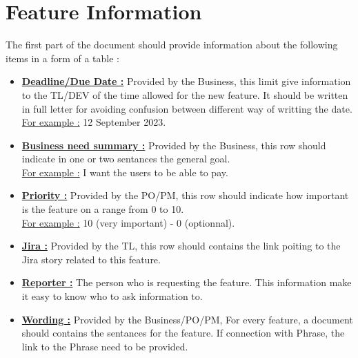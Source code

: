 \documentclass[a4paper,article,oneside]{memoir}
\begin{document}
        \section{Feature Information}
        The first part of the document should provide information about the following items in a form of a table :
        \begin{itemize}
  			\item {\color{BrickRed}\textbf{\underline{Deadline/Due Date :}}} Provided by the \gls{Business}, this limit give information to the \gls{TL}/\gls{DEV} of the time allowed for the new feature. It should be written in full letter for avoiding confusion between different way of writting the date. \\{\color{ForestGreen}\underline{For example :} 12 September 2023.}
  			 \item {\color{BrickRed}\textbf{\underline{Business need summary :}}} Provided by the \gls{Business}, this row should indicate in one or two sentances the general goal. \\{\color{ForestGreen}\underline{For example :} I want the users to be able to pay.}
  			 \item {\color{BrickRed}\textbf{\underline{Priority :}}} Provided by the \gls{PO}/\gls{PM}, this row should indicate how important is the feature on a range from 0 to 10. \\{\color{ForestGreen}\underline{For example :} 10 (very important) - 0 (optionnal).}
  			 \item {\color{BrickRed}\textbf{\underline{Jira :}}} Provided by the \gls{TL}, this row should contains the link poiting to the Jira story related to this feature.
  			   			 \item {\color{BrickRed}\textbf{\underline{Reporter :}}} The person who is requesting the feature. This information make it easy to know who to ask information to.
  		\item {\color{BrickRed}\textbf{\underline{Wording :}}} Provided by the \gls{Business}/\gls{PO}/\gls{PM}, For every feature, a document should contains the sentances for the feature. If connection with Phrase, the link to the Phrase need to be provided.
		\end{itemize}
\noindent{}

		
\end{document}

